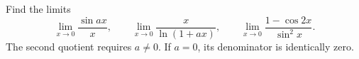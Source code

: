 \begin{exercise}
  \label{ex:hw07:trigonometric-logarithmic-limits}
  Find the limits
  \[
    \lim_{x\to0}\frac{\sin ax}{x},\qquad
    \lim_{x\to0}\frac{x}{\ln(1+ax)},\qquad
    \lim_{x\to0}\frac{1-\cos2x}{\sin^2x}.
  \]
  The second quotient requires $a\ne0$.
    If $a=0$, its denominator is identically zero.
\end{exercise}
